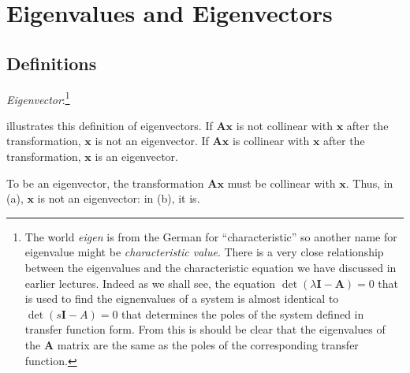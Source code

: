 \section*{Eigenvalues and Eigenvectors} %
\label{sub:eigenvalues_and_eigenvectors}

\subsection*{Definitions} %
\label{ssub:Definitions}


\emph{Eigenvector}:\footnote{The world \emph{eigen} is from the German for ``characteristic'' so another name for eigenvalue might be \emph{characteristic value}. There is a very close relationship between the eigenvalues and the characteristic equation we have discussed in earlier lectures. Indeed as we shall see, the equation $\det(\lambda\mathbf{I}-\mathbf{A})=0$ that is used to find the eignenvalues of a system is almost identical to $\det(s\mathbf{I}-A)=0$ that determines the poles of the system defined in transfer function form. From this is should be clear that the eigenvalues of the $\mathbf{A}$ matrix are the same as the poles of the corresponding transfer function.} 
\ifslidesonly
\begin{slide}
   
\end{slide}
\fi
{} illustrates this definition of eigenvectors. If $\mathbf{Ax}$ is not collinear with $\mathbf{x}$ after the transformation, $\mathbf{x}$ is not an eigenvector. If $\mathbf{Ax}$ is collinear with $\mathbf{x}$ after the transformation, $\mathbf{x}$ is  an eigenvector.

\begin{slide}\label{slide:eigenvector}
	\begin{center}
	\end{center}
   To be an eigenvector, the transformation $\mathbf{Ax}$ must be collinear with $\mathbf{x}$. Thus, in (a), $\mathbf{x}$ is not an eigenvector: in (b), it is.
\end{slide}

